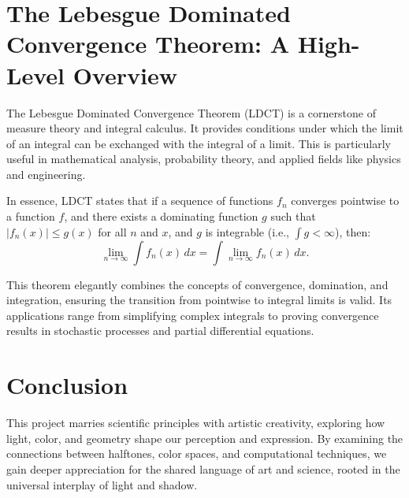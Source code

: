 \documentclass{article}
\begin{document}
\section*{The Lebesgue Dominated Convergence Theorem: A High-Level Overview}
The Lebesgue Dominated Convergence Theorem (LDCT) is a cornerstone of measure theory and integral calculus. It provides conditions under which the limit of an integral can be exchanged with the integral of a limit. This is particularly useful in mathematical analysis, probability theory, and applied fields like physics and engineering.

In essence, LDCT states that if a sequence of functions \(f_n\) converges pointwise to a function \(f\), and there exists a dominating function \(g\) such that \(|f_n(x)| \leq g(x)\) for all \(n\) and \(x\), and \(g\) is integrable (i.e., \(\int g < \infty\)), then:
\[
\lim_{n \to \infty} \int f_n(x) \, dx = \int \lim_{n \to \infty} f_n(x) \, dx.
\]

This theorem elegantly combines the concepts of convergence, domination, and integration, ensuring the transition from pointwise to integral limits is valid. Its applications range from simplifying complex integrals to proving convergence results in stochastic processes and partial differential equations.

\section*{Conclusion}
This project marries scientific principles with artistic creativity, exploring how light, color, and geometry shape our perception and expression. By examining the connections between halftones, color spaces, and computational techniques, we gain deeper appreciation for the shared language of art and science, rooted in the universal interplay of light and shadow.
\end{document}
